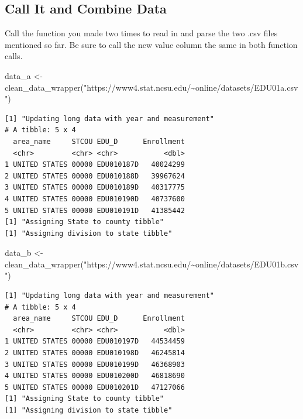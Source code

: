 \documentclass[
  letterpaper,
  DIV=11,
  numbers=noendperiod]{scrartcl}
\newenvironment{Shaded}{\begin{snugshade}}{\end{snugshade}}
\newcommand{\FunctionTok}[1]{\textcolor[rgb]{0.28,0.35,0.67}{#1}}
\newcommand{\NormalTok}[1]{\textcolor[rgb]{0.00,0.23,0.31}{#1}}
\newcommand{\OtherTok}[1]{\textcolor[rgb]{0.00,0.23,0.31}{#1}}
\newcommand{\StringTok}[1]{\textcolor[rgb]{0.13,0.47,0.30}{#1}}
\begin{document}
\subsection{Call It and Combine Data}\label{call-it-and-combine-data}

Call the function you made two times to read in and parse the two .csv
files mentioned so far. Be sure to call the new value column the same in
both function calls.

\begin{Shaded}
\begin{Highlighting}[]
\NormalTok{data\_a }\OtherTok{\textless{}{-}} \FunctionTok{clean\_data\_wrapper}\NormalTok{(}\StringTok{"https://www4.stat.ncsu.edu/\textasciitilde{}online/datasets/EDU01a.csv"}\NormalTok{)}
\end{Highlighting}
\end{Shaded}

\begin{verbatim}
[1] "Updating long data with year and measurement"
# A tibble: 5 x 4
  area_name     STCOU EDU_D      Enrollment
  <chr>         <chr> <chr>           <dbl>
1 UNITED STATES 00000 EDU010187D   40024299
2 UNITED STATES 00000 EDU010188D   39967624
3 UNITED STATES 00000 EDU010189D   40317775
4 UNITED STATES 00000 EDU010190D   40737600
5 UNITED STATES 00000 EDU010191D   41385442
[1] "Assigning State to county tibble"
[1] "Assigning division to state tibble"
\end{verbatim}

\begin{Shaded}
\begin{Highlighting}[]
\NormalTok{data\_b }\OtherTok{\textless{}{-}} \FunctionTok{clean\_data\_wrapper}\NormalTok{(}\StringTok{"https://www4.stat.ncsu.edu/\textasciitilde{}online/datasets/EDU01b.csv"}\NormalTok{)}
\end{Highlighting}
\end{Shaded}

\begin{verbatim}
[1] "Updating long data with year and measurement"
# A tibble: 5 x 4
  area_name     STCOU EDU_D      Enrollment
  <chr>         <chr> <chr>           <dbl>
1 UNITED STATES 00000 EDU010197D   44534459
2 UNITED STATES 00000 EDU010198D   46245814
3 UNITED STATES 00000 EDU010199D   46368903
4 UNITED STATES 00000 EDU010200D   46818690
5 UNITED STATES 00000 EDU010201D   47127066
[1] "Assigning State to county tibble"
[1] "Assigning division to state tibble"
\end{verbatim}
\end{document}
